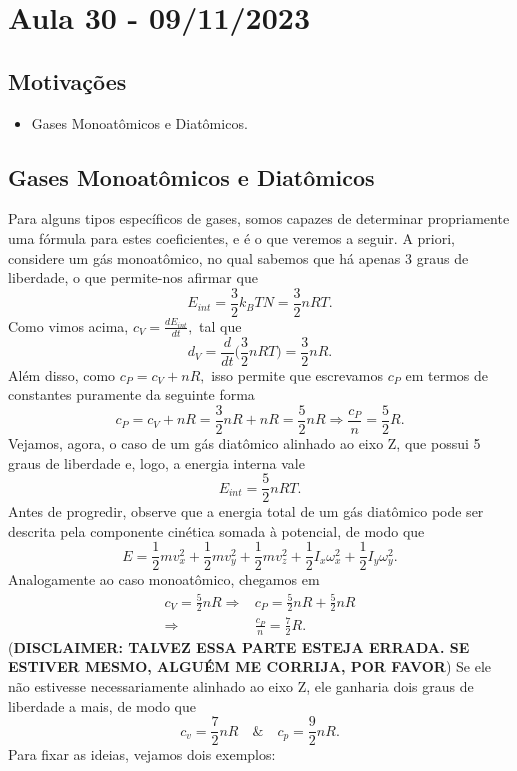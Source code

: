 \documentclass[phsyicsII_notes.tex]{subfiles}
\begin{document}
\section{Aula 30 - 09/11/2023}
\subsection{Motivações}
\begin{itemize}
	\item Gases Monoatômicos e Diatômicos.
\end{itemize}
\subsection{Gases Monoatômicos e Diatômicos}
Para alguns tipos específicos de gases, somos capazes de determinar propriamente uma fórmula para estes coeficientes, e é o que veremos a seguir.
A priori, considere um gás monoatômico, no qual sabemos que há apenas 3 graus de liberdade, o que permite-nos afirmar que
\[
	E_{int} = \frac{3}{2}k_{B}TN = \frac{3}{2}nRT.
\]
Como vimos acima, \(c_{V} = \frac{dE_{int}}{dt},\) tal que
\[
	d_{V} = \frac{d}{dt}\biggl(\frac{3}{2}nRT\biggr) = \frac{3}{2}nR.
\]
Além disso, como \(c_{P} = c_{V} + nR,\) isso permite que escrevamos \(c_{P}\) em termos de constantes puramente da seguinte
forma
\[
	c_{P} = c_{V} + nR = \frac{3}{2}nR + nR = \frac{5}{2}nR \Rightarrow \frac{c_{P}}{n} = \frac{5}{2}R.
\]
Vejamos, agora, o caso de um gás diatômico alinhado ao eixo Z, que possui 5 graus de liberdade e, logo, a energia interna vale
\[
	E_{int} = \frac{5}{2}nRT.
\]
Antes de progredir, observe que a energia total de um gás diatômico pode ser descrita pela componente cinética somada à potencial, de modo que
\[
	E = \frac{1}{2}mv_{x}^{2} + \frac{1}{2}mv_{y}^{2} + \frac{1}{2}mv_{z}^{2} + \frac{1}{2}I_{x}\omega_{x}^{2} + \frac{1}{2}I_{y}\omega_{y}^{2}.
\]
Analogamente ao caso monoatômico, chegamos em
\begin{align*}
	c_{V} = \frac{5}{2}nR \Rightarrow & c_{P} = \frac{5}{2}nR + \frac{5}{2}nR \\
	\Rightarrow                       & \frac{c_{P}}{n} = \frac{7}{2}R.
\end{align*}
(\textbf{DISCLAIMER: TALVEZ ESSA PARTE ESTEJA ERRADA. SE ESTIVER MESMO, ALGUÉM ME CORRIJA, POR FAVOR}) Se ele não estivesse necessariamente alinhado ao eixo Z, ele ganharia dois graus de liberdade a mais,
de modo que
\[
	c_{v} = \frac{7}{2}nR \quad\&\quad c_{p} = \frac{9}{2}nR.
\]
Para fixar as ideias, vejamos dois exemplos:
\end{document}
